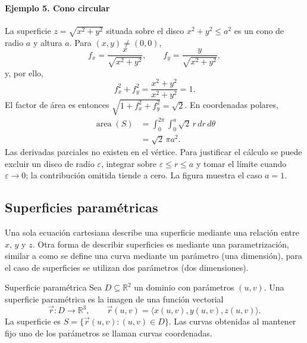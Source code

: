 \paragraph{Ejemplo 5. Cono circular}
La superficie $z=\sqrt{x^2+y^2}$ situada sobre el disco $x^2+y^2\leq a^2$ es un cono de radio $a$ y altura $a$. Para $(x,y)\neq(0,0)$,
\[
f_x=\frac{x}{\sqrt{x^2+y^2}},
\qquad
f_y=\frac{y}{\sqrt{x^2+y^2}},
\]
y, por ello,
\[
f_x^2+f_y^2
=\frac{x^2+y^2}{x^2+y^2}=1.
\]
El factor de área es entonces $\sqrt{1+f_x^2+f_y^2}=\sqrt2$. En coordenadas polares,
\begin{align*}
\operatorname{area}(S)
&=\int_0^{2\pi}\int_0^a\sqrt2\,r\,dr\,d\theta\\
&=\sqrt2\,\pi a^2.
\end{align*}
Las derivadas parciales no existen en el vértice. Para justificar el cálculo se puede excluir un disco de radio $\varepsilon$, integrar sobre $\varepsilon\leq r\leq a$ y tomar el límite cuando $\varepsilon\to0$; la contribución omitida tiende a cero. La figura muestra el caso $a=1$.

\begingroup\shorthandoff{>}
\begin{center}
\end{center}
\endgroup

\subsection{Superficies paramétricas}

Una sola ecuación cartesiana describe una superficie mediante una relación entre $x$, $y$ y $z$. Otra forma de describir superficies es mediante una parametrización, similar a como se define una curva mediante un parámetro (una dimensión), para el caso de superficies se utilizan dos parámetros (dos dimensiones).

\begin{mydefinition}{Superficie paramétrica}
Sea $D\subseteq\mathbb R^2$ un dominio con parámetros $(u,v)$. Una superficie paramétrica es la imagen de una función vectorial
\[
\vec r:D\to\mathbb R^3,
\qquad
\vec r(u,v)=\langle x(u,v),y(u,v),z(u,v)\rangle.
\]
La superficie es $S=\{\vec r(u,v):(u,v)\in D\}$. Las curvas obtenidas al mantener fijo uno de los parámetros se llaman curvas coordenadas.
\end{mydefinition}


